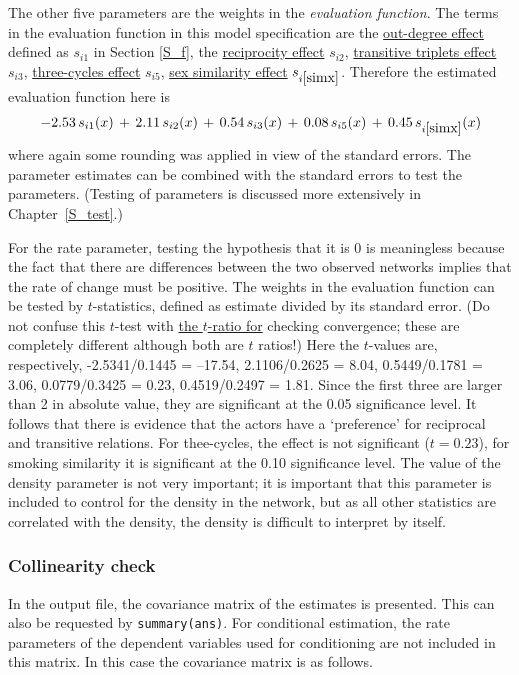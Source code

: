 \documentclass[a4paper,fleqn,11pt]{article}
\newcommand{\+}{\, + \,}
\begin{document}
The other five parameters are the weights in the \emph{evaluation function}.
The terms in the evaluation function in this model specification are
the \hyperlink{T_density}{out-degree effect} defined as $s_{i1}$ in
Section \ref{S_f}, the
\hyperlink{T_reci}{reciprocity effect} $s_{i2}$,
\hyperlink{T_transtrip}{transitive triplets effect} $s_{i3}$,
\hyperlink{T_cycle3}{three-cycles effect} $s_{i5}$,
\hyperlink{T_simx}{sex similarity effect} $s_{i\ref{simx}}$.
Therefore the
estimated evaluation function here is
\[
\,- 2.53 \, s_{i1}(x) \+ 2.11\, s_{i2}(x) \+ 0.54 \, s_{i3}(x)\+ 0.08 \, s_{i5}(x)\+ 0.45 \, s_{i\ref{simx}}(x)
\]
where again some rounding was applied in view of the standard errors.
The parameter estimates can be combined with
the standard errors to test the parameters.
(Testing of parameters is discussed more extensively
in Chapter~\ref{S_test}.)

 For the rate
parameter, testing the hypothesis that it is 0 is meaningless
because the fact that there are differences between the two observed
networks implies that the rate of change must be positive. The
weights in the evaluation function can be tested by $t$-statistics,
defined as estimate divided by its standard error. (Do not confuse
this $t$-test with \hyperlink{T_convergence}{the $t$-ratio for}
checking convergence; these are completely different although both
are $t$ ratios!) Here the $t$-values are, respectively,
 -2.5341/0.1445 = --17.54,
  2.1106/0.2625 = 8.04,
  0.5449/0.1781 = 3.06,
  0.0779/0.3425 = 0.23,
  0.4519/0.2497 = 1.81.
 Since the first three are larger than 2 in absolute value, they are
significant at the 0.05 significance level. It follows that there is
evidence that the actors have a `preference' for reciprocal
and transitive relations.
For thee-cycles, the effect is not significant ($t = 0.23$),
for smoking similarity it is significant at the 0.10 significance level.
The value of the density parameter is not very important; it is
important that this parameter is included to control for the density
in the network, but as all other statistics are correlated with the
density, the density is difficult to interpret by itself.

\subsubsection{Collinearity check}
\label{S_collinear}

In the output file, the covariance matrix
of the estimates is presented.
This can also be requested by \texttt{summary(ans)}.
For conditional estimation, the rate parameters of the dependent variables
used for conditioning are not included in this matrix.
In this case the covariance matrix is as follows.
\end{document}
